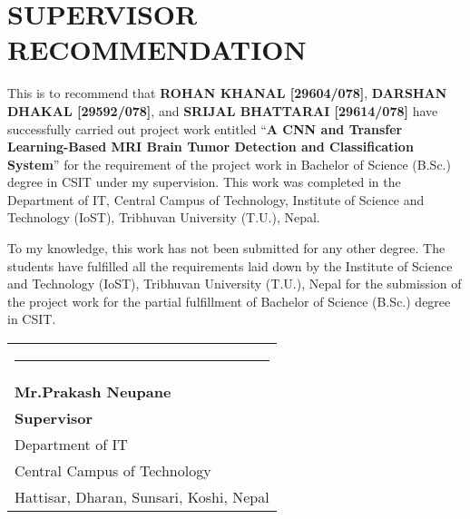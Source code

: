 \section*{\centering \Large \textbf{SUPERVISOR RECOMMENDATION}}
\sloppy
This is to recommend that \textbf{ROHAN KHANAL [29604/078]}, \textbf{DARSHAN DHAKAL [29592/078]}, and \textbf{SRIJAL BHATTARAI [29614/078]} have successfully carried out project work entitled ``\textbf{A CNN and Transfer Learning-Based MRI Brain Tumor Detection and Classification System}'' for the requirement of the project work in Bachelor of Science (B.Sc.) degree in CSIT under my supervision. This work was completed in the Department of IT, Central Campus of Technology, Institute of Science and Technology (IoST), Tribhuvan University (T.U.), Nepal.


To my knowledge, this work has not been submitted for any other degree. The students have fulfilled all the requirements laid down by the Institute of Science and Technology (IoST), Tribhuvan University (T.U.), Nepal for the submission of the project work for the partial fulfillment of Bachelor of Science (B.Sc.) degree in CSIT.

\begin{flushleft}
\begin{tabular}{@{}l@{}}
    \rule{4cm}{0.4pt} \\
    \textbf{Mr.\@ Prakash Neupane} \\
    \textbf{Supervisor} \\
    Department of IT \\
    Central Campus of Technology \\
    Hattisar, Dharan, Sunsari, Koshi, Nepal \\
\end{tabular}
\end{flushleft}

\newpage